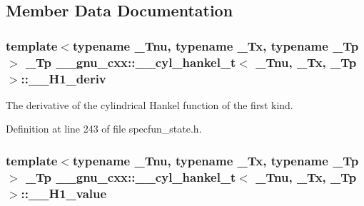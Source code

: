 \subsection{Member Data Documentation}
\subsubsection[{\texorpdfstring{\+\_\+\+\_\+\+H1\+\_\+deriv}{__H1_deriv}}]{\setlength{\rightskip}{0pt plus 5cm}template$<$typename \+\_\+\+Tnu, typename \+\_\+\+Tx, typename \+\_\+\+Tp$>$ \+\_\+\+Tp {\bf \+\_\+\+\_\+gnu\+\_\+cxx\+::\+\_\+\+\_\+cyl\+\_\+hankel\+\_\+t}$<$ \+\_\+\+Tnu, \+\_\+\+Tx, \+\_\+\+Tp $>$\+::\+\_\+\+\_\+\+H1\+\_\+deriv}\hypertarget{struct____gnu__cxx_1_1____cyl__hankel__t_abdf155edcf5e494c4ba264f385c2407a}{}\label{struct____gnu__cxx_1_1____cyl__hankel__t_abdf155edcf5e494c4ba264f385c2407a}


The derivative of the cylindrical Hankel function of the first kind. 



Definition at line 243 of file specfun\+\_\+state.\+h.

\subsubsection[{\texorpdfstring{\+\_\+\+\_\+\+H1\+\_\+value}{__H1_value}}]{\setlength{\rightskip}{0pt plus 5cm}template$<$typename \+\_\+\+Tnu, typename \+\_\+\+Tx, typename \+\_\+\+Tp$>$ \+\_\+\+Tp {\bf \+\_\+\+\_\+gnu\+\_\+cxx\+::\+\_\+\+\_\+cyl\+\_\+hankel\+\_\+t}$<$ \+\_\+\+Tnu, \+\_\+\+Tx, \+\_\+\+Tp $>$\+::\+\_\+\+\_\+\+H1\+\_\+value}\hypertarget{struct____gnu__cxx_1_1____cyl__hankel__t_a8166d6e3378ad824fafcb5f440b65b3a}{}\label{struct____gnu__cxx_1_1____cyl__hankel__t_a8166d6e3378ad824fafcb5f440b65b3a}


